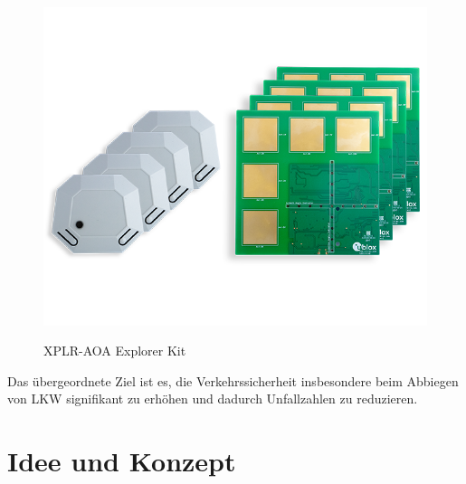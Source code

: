 \documentclass[a4paper, 12pt]{article} %
\begin{document}
\begin{spacing}{1.8}
\begin{figure}[H]
    \includegraphics[width=0.8\linewidth]{images/XPLR-AOA-with-C209-and-C211-02_0}\\[1ex]
    \centering
    \caption{XPLR-AOA Explorer Kit \cite{u_blox_xplr_aoa2_kit}}
    \label{ABBILDUNG 76}
\end{figure}

Das übergeordnete Ziel ist es, die Verkehrssicherheit insbesondere beim 
Abbiegen von LKW signifikant zu erhöhen und dadurch Unfallzahlen zu reduzieren.

\end{spacing}

\clearpage

\section{Idee und Konzept}
\label{sec:Idee und Konzept}
\end{document}
